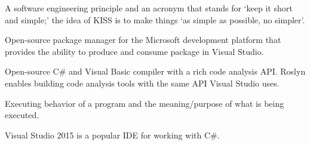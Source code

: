 \documentclass[draftclsnofoot,onecolumn]{IEEEtran}
\begin{document}
\begin{description}
\item[KISS:] A software engineering principle and an acronym that stands for `keep it short and simple;' the idea of KISS is to make things `as simple as possible, no simpler'.

\item[NuGet Package:] Open-source package manager for the Microsoft development platform that provides the ability to produce and consume package in Visual Studio.

\item[Roslyn:] Open-source C\# and Visual Basic compiler with a rich code analysis API. Roslyn enables building code analysis tools with the same API Visual Studio uses.

\item[Semantics:] Executing behavior of a program and the meaning/purpose of what is being executed. 

\item[VS:] Visual Studio 2015 is a popular IDE for working with C\#.

\end{description}
\end{document}
